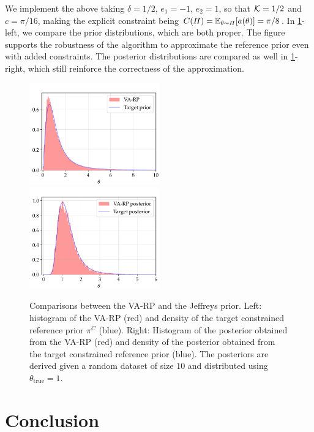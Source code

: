 We implement the above taking $\delta=1/2$, $e_1=-1$, $e_2=1$, so that $\mathcal{K}=1/2$ and $c=\pi/16$, making the explicit constraint being $C(\varPi) =\mathbb{E}_{\theta\sim\varPi}[a(\theta)]=\pi/8$. In  \cref{fig:VARP:normal-constr}-left, we compare the prior distributions, which are both proper. The figure %
supports the robustness of the algorithm to approximate the reference prior even with added constraints.
The posterior distributions are compared as well in \cref{fig:VARP:normal-constr}-right, which still reinforce the correctness of the approximation.


\begin{figure}[h]
    \centering
    \includegraphics[width=5.625cm]{figures/va-rp/normal_prior_constr.pdf}\hspace*{0.2cm}
    \includegraphics[width=5.625cm]{figures/va-rp/normal_post_constr.pdf}
    \caption{Comparisons between the VA-RP and the Jeffreys prior. Left: histogram of the VA-RP (red) and density of the target constrained reference prior $\pi^C$ (blue). Right: Histogram of the posterior obtained from the VA-RP (red) and density of the posterior obtained from the target constrained reference prior (blue). The posteriors are derived given a random dataset of size $10$ and distributed using $\theta_{\text{true}}=1$.}
    \label{fig:VARP:normal-constr}
\end{figure}


\section{Conclusion}\label{sec:VARP:conclusion}





